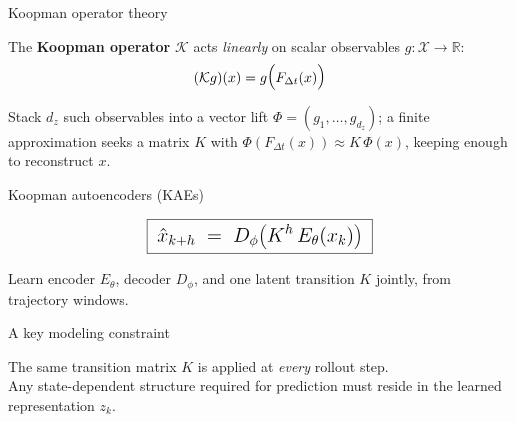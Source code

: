 \documentclass[aspectratio=169,10pt]{beamer}
\newcommand{\emphp}[1]{{\color{skaepurple}\bfseries #1}}
\newcommand{\R}{\mathbb{R}}
\newcommand{\statement}[1]{\vfill\begin{center}\Large\color{skaeink}#1\end{center}\vfill}
\begin{document}
\begin{frame}{Koopman operator theory}
  \begin{center}
  The \emphp{Koopman operator} $\mathcal{K}$ acts \emph{linearly} on scalar observables $g:\mathcal{X}\to\R$:
  \[
    \Large (\mathcal{K}g)(x)=g\big(F_{\Delta t}(x)\big)
  \]
  \end{center}
  \begin{center}
  \end{center}
  \vspace{0.2em}
  \begin{center}\small\color{skaegray}
  Stack $d_z$ such observables into a vector lift $\Phi=(g_1,\dots,g_{d_z})$; a finite approximation seeks a matrix $K$ with $\Phi(F_{\Delta t}(x))\approx K\,\Phi(x)$, keeping enough to reconstruct $x$.
  \end{center}
\end{frame}

\begin{frame}{Koopman autoencoders (KAEs)}
  
  \[
    \Large\boxed{\;\hat{x}_{k+h}\;=\;D_\phi\big(K^{h}\,E_\theta(x_k)\big)\;}
  \]
  \vspace{0.4em}
  \begin{center}\small\color{skaegray}
  Learn encoder $E_\theta$, decoder $D_\phi$, and one latent transition $K$ jointly, from trajectory windows.
  \end{center}
\end{frame}

\begin{frame}{A key modeling constraint}
  \statement{The same transition matrix $K$ is applied at \emph{every} rollout step.\\[0.8em]
  Any state-dependent structure required for prediction must reside in the learned representation $z_k$.}
\end{frame}
\end{document}
